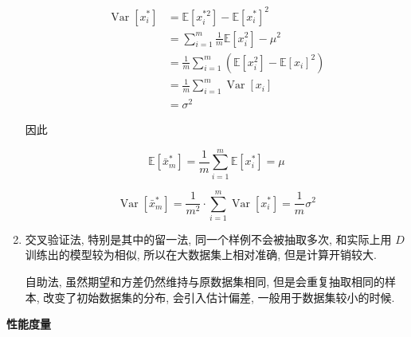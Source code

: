 \documentclass[answers]{exam}  %
\begin{document}
\begin{questions}
\begin{solution}
\begin{enumerate}
            \begin{equation}
              \begin{aligned}
                \operatorname{Var}[x_i^{*}] & = \mathbb{E}[x_i^{*2}] - \mathbb{E}[x_i^{*}]^{2}                        \\
                                            & = \sum_{i=1}^{m} \frac{1}{m}\mathbb{E}[x_i^{2}] - \mu^{2}               \\
                                            & = \frac{1}{m}\sum_{i=1}^{m} (\mathbb{E}[x_i^{2}] - \mathbb{E}[x_i]^{2}) \\
                                            & = \frac{1}{m}\sum_{i=1}^{m} \operatorname{Var}[x_i]                     \\
                                            & = \sigma^{2}
              \end{aligned}
            \end{equation}

            因此

            \begin{equation}
              \mathbb{E}[\bar{x}_m^{*}] = \frac{1}{m}\sum_{i=1}^{m} \mathbb{E}[x_i^{*}] = \mu
            \end{equation}

            \begin{equation}
              \operatorname{Var}[\bar{x}_m^{*}] = \frac{1}{m^{2}} \cdot \sum_{i=1}^{m} \operatorname{Var}[x_i^{*}] = \frac{1}{m}\sigma^{2}
            \end{equation}

      \item 交叉验证法, 特别是其中的留一法, 同一个样例不会被抽取多次, 和实际上用 $D$ 训练出的模型较为相似, 所以在大数据集上相对准确, 但是计算开销较大.

            自助法, 虽然期望和方差仍然维持与原数据集相同, 但是会重复抽取相同的样本, 改变了初始数据集的分布, 会引入估计偏差, 一般用于数据集较小的时候.
    \end{enumerate}
  \end{solution}


  \question [30] \textbf{性能度量}


\end{questions}
\end{document}
